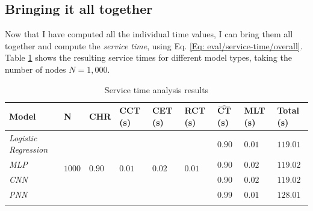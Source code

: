 			\subsection{Bringing it all together} \label{Section: eval/service-time/together}
			Now that I have computed all the individual time values, I can bring them all together and compute the \textit{service time}, using Eq. \ref{Eq: eval/service-time/overall}. Table \ref{Table: eval/service-time/together/overall} shows the resulting service times for different model types, taking the number of nodes $N=1,000$.
			\newpage
			\begin{longtable}{|p{}||p{.08\textwidth}|p{}|p{}|p{}|p{}|p{}|p{}||p{}|}
				\textbf{Model} & \textbf{N} & \textbf{CHR}  &\textbf{CCT} (s) & \textbf{CET} (s) & \textbf{RCT} (s)& $\mathbf{\hat{CT}}$ (s)& \textbf{MLT} (s) & \textbf{Total} (s)\\
				\hline
				\textit{Logistic Regression} & \multirow{5}{*}{$1000$} & \multirow{5}{*}{$0.90$} & \multirow{5}{*}{$0.01$} & \multirow{5}{*}{$0.02$} & \multirow{5}{*}{$0.01$} & $0.90$ & $0.01$ & \cellcolor{green!20} $\mathbf{119.01}$ \\
				\hhline{-~~~~---}
				\textit{MLP} &  &  &   & &  & $0.90$ & $0.02$ &\cellcolor{green!20} $\mathbf{119.02}$  \\
				\hhline{-~~~~---}
				\textit{CNN} &  &  &  & &  & $0.90$ & $0.02$ & \cellcolor{green!20} $\mathbf{119.02}$ \\
				\hhline{-~~~~---}
				\hhline{-~~~~---}
				\textit{PNN} &  &  &  & &  & $0.99$ & $0.01$ & \cellcolor{green!20} $\mathbf{128.01}$ \\
				\hline
				\caption{Service time analysis results}
				\label{Table: eval/service-time/together/overall}
			\end{longtable}
			
